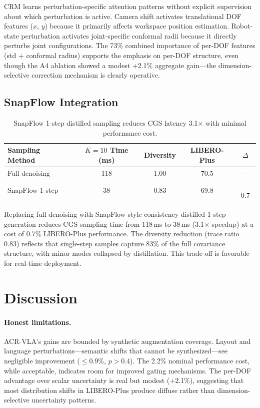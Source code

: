\documentclass[letterpaper]{article}
\begin{document}
CRM learns perturbation-specific attention patterns without explicit supervision about which perturbation is active.
Camera shift activates translational DOF features ($x$, $y$) because it primarily affects workspace position estimation.
Robot-state perturbation activates joint-specific conformal radii because it directly perturbs joint configurations.
The 73\% combined importance of per-DOF features (std + conformal radius) supports the emphasis on per-DOF structure, even though the A4 ablation showed a modest +2.1\% aggregate gain---the dimension-selective correction mechanism is clearly operative.

\subsection{SnapFlow Integration}
\label{sec:snapflow}

\begin{table}[h]
\centering
\caption{SnapFlow 1-step distilled sampling reduces CGS latency 3.1$\times$ with minimal performance cost.}
\label{tab:snapflow}
\begin{tabular}{lcccc}
\toprule
Sampling Method & $K{=}10$ Time (ms) & Diversity & LIBERO-Plus & $\Delta$ \\
\midrule
Full denoising & 118 & 1.00 & 70.5 & --- \\
SnapFlow 1-step & 38 & 0.83 & 69.8 & $-$0.7 \\
\bottomrule
\end{tabular}
\end{table}

Replacing full denoising with SnapFlow-style consistency-distilled 1-step generation reduces CGS sampling time from 118\,ms to 38\,ms (3.1$\times$ speedup) at a cost of 0.7\% LIBERO-Plus performance.
The diversity reduction (trace ratio 0.83) reflects that single-step samples capture 83\% of the full covariance structure, with minor modes collapsed by distillation.
This trade-off is favorable for real-time deployment.

\section{Discussion}
\label{sec:discussion}

\paragraph{Honest limitations.}
ACR-VLA's gains are bounded by synthetic augmentation coverage.
Layout and language perturbations---semantic shifts that cannot be synthesized---see negligible improvement ($\leq$0.9\%, $p > 0.4$).
The 2.2\% nominal performance cost, while acceptable, indicates room for improved gating mechanisms.
The per-DOF advantage over scalar uncertainty is real but modest (+2.1\%), suggesting that most distribution shifts in LIBERO-Plus produce diffuse rather than dimension-selective uncertainty patterns.
\end{document}

